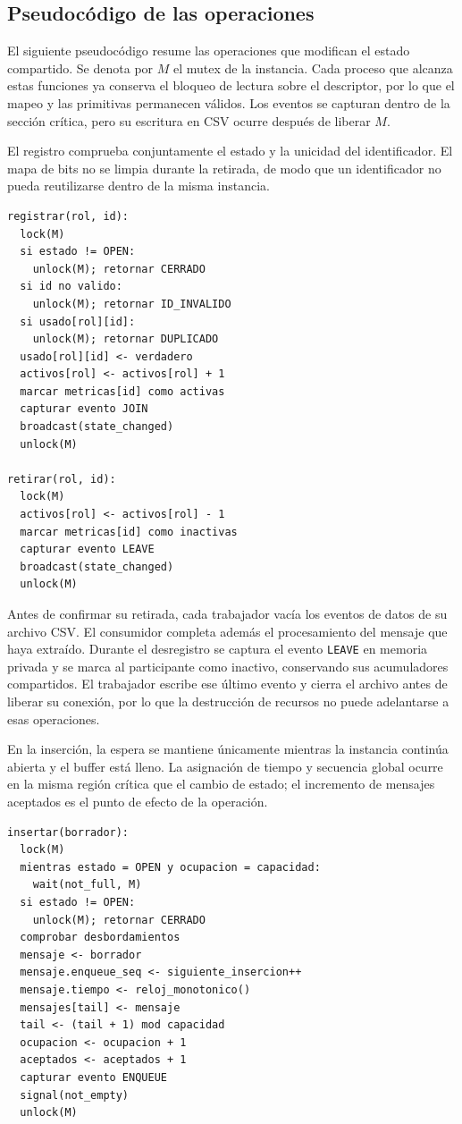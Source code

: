 \documentclass[conference]{IEEEtran}
\begin{document}
\subsection{Pseudocódigo de las operaciones}
El siguiente pseudocódigo resume las operaciones que modifican el estado compartido. Se denota por $M$ el mutex de la instancia. Cada proceso que alcanza estas funciones ya conserva el bloqueo de lectura sobre el descriptor, por lo que el mapeo y las primitivas permanecen válidos. Los eventos se capturan dentro de la sección crítica, pero su escritura en CSV ocurre después de liberar $M$.

El registro comprueba conjuntamente el estado y la unicidad del identificador. El mapa de bits no se limpia durante la retirada, de modo que un identificador no pueda reutilizarse dentro de la misma instancia.

{\footnotesize
\begin{verbatim}
registrar(rol, id):
  lock(M)
  si estado != OPEN:
    unlock(M); retornar CERRADO
  si id no valido:
    unlock(M); retornar ID_INVALIDO
  si usado[rol][id]:
    unlock(M); retornar DUPLICADO
  usado[rol][id] <- verdadero
  activos[rol] <- activos[rol] + 1
  marcar metricas[id] como activas
  capturar evento JOIN
  broadcast(state_changed)
  unlock(M)

retirar(rol, id):
  lock(M)
  activos[rol] <- activos[rol] - 1
  marcar metricas[id] como inactivas
  capturar evento LEAVE
  broadcast(state_changed)
  unlock(M)
\end{verbatim}
}

Antes de confirmar su retirada, cada trabajador vacía los eventos de datos de su archivo CSV. El consumidor completa además el procesamiento del mensaje que haya extraído. Durante el desregistro se captura el evento \texttt{LEAVE} en memoria privada y se marca al participante como inactivo, conservando sus acumuladores compartidos. El trabajador escribe ese último evento y cierra el archivo antes de liberar su conexión, por lo que la destrucción de recursos no puede adelantarse a esas operaciones.

En la inserción, la espera se mantiene únicamente mientras la instancia continúa abierta y el buffer está lleno. La asignación de tiempo y secuencia global ocurre en la misma región crítica que el cambio de estado; el incremento de mensajes aceptados es el punto de efecto de la operación.

{\footnotesize
\begin{verbatim}
insertar(borrador):
  lock(M)
  mientras estado = OPEN y ocupacion = capacidad:
    wait(not_full, M)
  si estado != OPEN:
    unlock(M); retornar CERRADO
  comprobar desbordamientos
  mensaje <- borrador
  mensaje.enqueue_seq <- siguiente_insercion++
  mensaje.tiempo <- reloj_monotonico()
  mensajes[tail] <- mensaje
  tail <- (tail + 1) mod capacidad
  ocupacion <- ocupacion + 1
  aceptados <- aceptados + 1
  capturar evento ENQUEUE
  signal(not_empty)
  unlock(M)
\end{verbatim}
}
\end{document}
